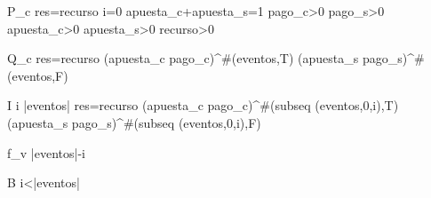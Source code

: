 

 P_c \equiv res=recurso \wedge i=0 \wedge apuesta_c+apuesta_s=1 \wedge pago_c>0 \wedge pago_s>0 \wedge apuesta_c>0 \wedge apuesta_s>0 \wedge recurso>0

 
\vspace{0.2cm}
Q_c \equiv res=recurso (apuesta_c pago_c)^{\#(eventos,T)} (apuesta_s pago_s)^{\#(eventos,F)}
\vspace{0.2cm}


I  \leq i \leq |eventos| \wedge res=recurso (apuesta_c pago_c)^{\#(subseq (eventos,0,i),T)} (apuesta_s pago_s)^{\#(subseq (eventos,0,i),F)}


\vspace{0.2cm}
f_v \equiv |eventos|-i


\vspace{0.2cm}
B \equiv i<|eventos|
